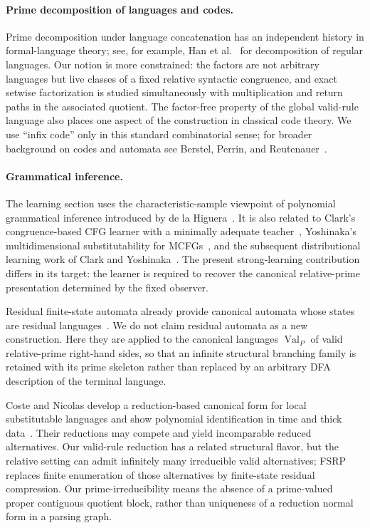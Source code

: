 \documentclass[11pt,a4paper]{article}
\newcommand{\Val}{\operatorname{Val}}
\begin{document}
\paragraph{Prime decomposition of languages and codes.}
Prime decomposition under language concatenation has an independent history in formal-language theory; see, for example, Han et al.~\cite{HanEtAl2007} for decomposition of regular languages.  Our notion is more constrained: the factors are not arbitrary languages but live classes of a fixed relative syntactic congruence, and exact setwise factorization is studied simultaneously with multiplication and return paths in the associated quotient.  The factor-free property of the global valid-rule language also places one aspect of the construction in classical code theory.  We use ``infix code'' only in this standard combinatorial sense; for broader background on codes and automata see Berstel, Perrin, and Reutenauer~\cite{BerstelPerrinReutenauer2009}.

\paragraph{Grammatical inference.}
The learning section uses the characteristic-sample viewpoint of polynomial grammatical inference introduced by de la Higuera~\cite{Higuera1997}.  It is also related to Clark's congruence-based CFG learner with a minimally adequate teacher~\cite{Clark2010MAT}, Yoshinaka's multidimensional substitutability for MCFGs~\cite{Yoshinaka2011}, and the subsequent distributional learning work of Clark and Yoshinaka~\cite{ClarkYoshinaka2014}.  The present strong-learning contribution differs in its target: the learner is required to recover the canonical relative-prime presentation determined by the fixed observer.

Residual finite-state automata already provide canonical automata whose states are residual languages~\cite{DenisLemayTerlutte2002}.  We do not claim residual automata as a new construction.  Here they are applied to the canonical languages $\Val_P$ of valid relative-prime right-hand sides, so that an infinite structural branching family is retained with its prime skeleton rather than replaced by an arbitrary DFA description of the terminal language.

Coste and Nicolas develop a reduction-based canonical form for local substitutable languages and show polynomial identification in time and thick data~\cite{CosteNicolas2019}.  Their reductions may compete and yield incomparable reduced alternatives.  Our valid-rule reduction has a related structural flavor, but the relative setting can admit infinitely many irreducible valid alternatives; FSRP replaces finite enumeration of those alternatives by finite-state residual compression.  Our prime-irreducibility means the absence of a prime-valued proper contiguous quotient block, rather than uniqueness of a reduction normal form in a parsing graph.
\end{document}

